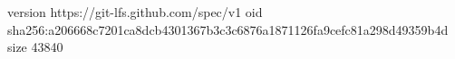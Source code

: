 version https://git-lfs.github.com/spec/v1
oid sha256:a206668c7201ca8dcb4301367b3c3c6876a1871126fa9cefc81a298d49359b4d
size 43840
